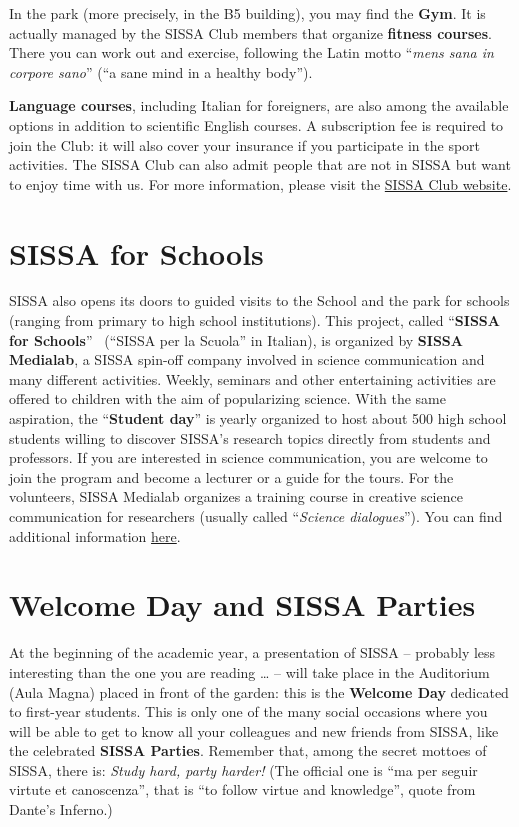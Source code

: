 \documentclass{sissavademecum}
\begin{document}
In the park (more precisely, in the B5 building), you may find the \textbf{Gym}. It is actually managed by the SISSA Club members that organize \textbf{fitness courses}. There you can work out and exercise, following the Latin motto ``\textit{mens sana in corpore sano}{}'' (``a sane mind in a healthy body''). 

\textbf{Language courses}, including Italian for foreigners, are also among the available options in addition to scientific English courses. A subscription fee is required to join the Club: it will also cover your insurance if you participate in the sport activities. The SISSA Club can also admit people that are not in SISSA but want to enjoy time with us. For more information, please visit the \href{http://club.sissa.it/}{SISSA Club website}. 


\section{SISSA for Schools}

SISSA also opens its doors to guided visits to the School and the park for schools (ranging from primary to high school institutions). This project, called ``\textbf{SISSA for Schools}{}'' \ (``SISSA per la Scuola'' in Italian), is organized by \textbf{SISSA Medialab}, a SISSA spin-off company involved in science communication and many different activities. Weekly, seminars and other entertaining activities are offered to children with the aim of popularizing science. With the same aspiration, the ``\textbf{Student day}'' is yearly organized to host about 500 high school students willing to discover SISSA's research topics directly from students and professors. If you are interested in science communication, you are welcome to join the program and become a lecturer or a guide for the tours.  For the volunteers, SISSA Medialab organizes a training course in creative science communication for researchers (usually called ``\textit{Science dialogues}''). You can find additional information \href{http://medialab.sissa.it/sissaperlascuola/en}{here}.


\section{Welcome Day and SISSA Parties}

At the beginning of the academic year, a presentation of SISSA -- probably less interesting than the one you are reading {\dots} -- will take place in the Auditorium (Aula Magna) placed in front of the garden: this is the \textbf{Welcome Day} dedicated to first-year students. This is only one of the many social occasions where you will be able to get to know all your colleagues and new friends from SISSA, like the celebrated \textbf{SISSA Parties}. Remember that, among the secret mottoes of SISSA, there is: \textit{Study hard, party harder!} (The official one is ``ma per seguir virtute et canoscenza'', that is ``to follow virtue and knowledge'', quote from Dante's Inferno.) 
\end{document}
